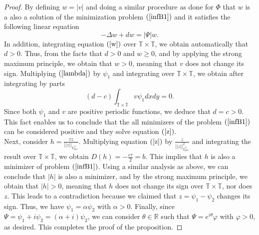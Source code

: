 \documentclass[12pt,reqno,a4paper]{amsart} %
\numberwithin{equation}{section}
\numberwithin{figure}{section}
\begin{document}
\begin{proof}
 		
By defining $w=|v|$ and doing a similar procedure as done for $\Phi$ that $w$ is a also a solution of the minimization problem $(\ref{infB1})$ and it satisfies the following linear equation
\begin{equation}\label{w}
-\Delta w+d w=|\Psi|w.
\end{equation}
In addition, integrating equation $(\ref{w})$ over $\mathbb{T}\times\mathbb{T}$, we obtain automatically that $d>0$. Thus, from the facts that $d>0$ and $w\geq0$, and by applying the strong maximum principle, we obtain that $w>0$, meaning that $v$ does not change its sign. Multiplying $(\ref{lambda})$ by $\psi_1$ and integrating over $\mathbb{T}\times\mathbb{T}$, we obtain after integrating by parts 
\begin{equation}\label{d-c}
		(d-c)\int_{\mathbb{T}\times\mathbb{T}}v\psi_1dxdy=0.
\end{equation}
Since both $\psi_1$ and $v$ are positive periodic functions, we deduce that $d=c>0$. This fact enables us to conclude that the all minimizers of the problem $(\ref{infB1})$ can be considered positive and they solve equation $(\ref{z})$.\\
\indent Next, consider $h=\frac{\tau z}{||z||_{L_{per}^2}}$. Multiplying equation $(\ref{z})$ by $\frac{z}{||z||_{L_{per}^2}^2}$ and integrating the result over $\mathbb{T}\times\mathbb{T}$, we obtain $D(h)=-\frac{c\tau}{2}=b$. This implies that $h$ is also a minimizer of problem $(\ref{infB1})$. Using a similar analysis as above, we can conclude that $|h|$ is also a minimizer, and by the strong maximum principle, we obtain that $|h| > 0$, meaning that $h$ does not change its sign over $\mathbb{T} \times \mathbb{T}$, nor does $z$. This leads to a contradiction because we claimed that $z=\psi_1-\psi_2$ changes its sign. Thus, we have $\psi_1 = \alpha \psi_2$ with $\alpha > 0$. Finally, since $\Psi = \psi_1 + i\psi_2 = (\alpha + i)\psi_2$, we can consider $\theta \in \mathbb{R}$ such that $\Psi = e^{i\theta}\varphi$ with $\varphi > 0$, as desired. This completes the proof of the proposition.
\end{proof}
\end{document}
